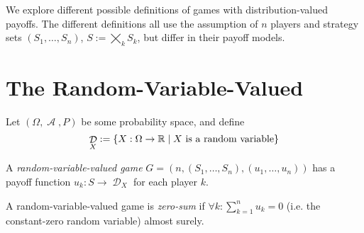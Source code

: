 \documentclass[a4paper]{scrreprt}
\DeclareMathOperator{\A}{\mathcal{A}}
\DeclareMathOperator{\D}{\mathcal{D}}
\begin{document}
    We explore different possible definitions of games with distribution-valued payoffs.
    The different definitions all use the assumption of $n$ players and strategy sets $(S_1, \dots, S_n)$, $S := \bigtimes_{k} S_k$, but differ in their payoff models.
    
    \setcounter{chapter}{1}
    \section{The Random-Variable-Valued}
    Let $(\Omega, \A, P)$ be some probability space, and define 
    \[\D_X := \set{X: \Omega \to \R \mid X \text{ is a random variable}}\]
    
    \begin{defn}
        A \emph{random-variable-valued game} $G = (n, (S_1, \dots, S_n), (u_1, \dots, u_n))$ has a payoff function $u_k: S \to \D_X$ for each player $k$.
    \end{defn}
    
    \begin{defn}
        A random-variable-valued game is \emph{zero-sum} if $\forall k: \sum_{k=1}^n u_k = 0$ (i.e. the constant-zero random variable) almost surely.
    \end{defn}
\end{document}
